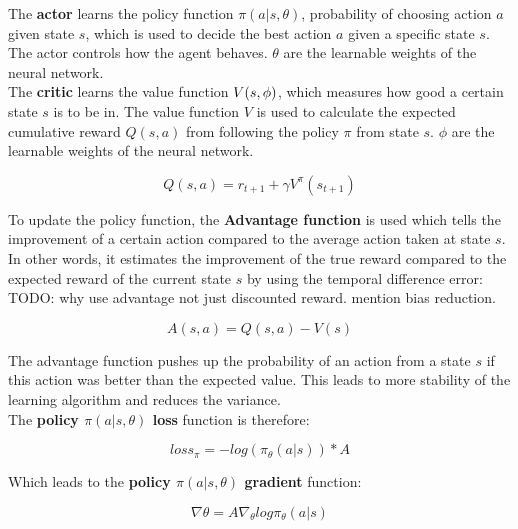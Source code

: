 The \textbf{actor} learns the policy function $\pi(a | s, \theta)$, probability of choosing action $a$ given state $s$, which is used to decide the best action $a$ given a specific state $s$.
The actor controls how the agent behaves.
$\theta$ are the learnable weights of the neural network. \\

The \textbf{critic} learns the value function $\mathnormal{V(s, \phi)}$, which measures how good a certain state $s$ is to be in. The value function $V$ is used to calculate the expected cumulative reward $Q(s, a)$ from following the policy $\pi$ from state $s$.
$\phi$ are the learnable weights of the neural network.

\begin{equation}
	Q(s, a) = r_{t+1} + \gamma V^\pi(s_{t+1})
\end{equation}

To update the policy function, the \textbf{Advantage function} is used which tells the improvement of a certain action compared to the average action taken at state $s$. 
In other words, it estimates the improvement of the true reward compared to the expected reward of the current state $s$ by using the temporal difference error:\\

TODO:   why use advantage not just discounted reward. mention bias reduction.

\begin{equation}
	A(s, a) = Q(s, a) - V(s)
\end{equation}

The advantage function pushes up the probability of an action from a state $s$ if this action was better than the expected value.
This leads to more stability of the learning algorithm and reduces the variance.\\

The \textbf{policy $\pi(a | s, \theta)$ loss} function is therefore:

\begin{equation}
	loss_\pi = - log (\pi_\theta(a | s)) * A
\end{equation}

Which leads to the \textbf{policy $\pi(a | s, \theta)$ gradient} function:

\begin{equation}
	\nabla \theta = A \nabla_\theta log \pi_\theta (a | s)
\end{equation}
	
